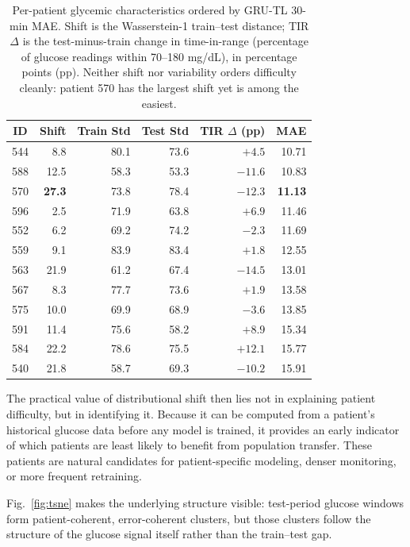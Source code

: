 \documentclass[conference]{IEEEtran}
\begin{document}
\begin{table}[t]
\centering
\caption{Per-patient glycemic characteristics ordered by GRU-TL 30-min MAE. Shift
is the Wasserstein-1 train--test distance; TIR $\Delta$ is the test-minus-train
change in time-in-range (percentage of glucose readings within 70--180 mg/dL), in
percentage points (pp). Neither shift nor variability orders difficulty cleanly:
patient 570 has the largest shift yet is among the easiest.}
\label{tab:patient}
\footnotesize
\setlength{\tabcolsep}{4.5pt}
\begin{tabular}{@{}c r rr r r@{}}
\toprule
ID & Shift & Train Std & Test Std & TIR $\Delta$ (pp) & MAE \\
\midrule
544 &  8.8 & 80.1 & 73.6 & $+4.5$  & 10.71 \\
588 & 12.5 & 58.3 & 53.3 & $-11.6$ & 10.83 \\
570 & \textbf{27.3} & 73.8 & 78.4 & $-12.3$ & \textbf{11.13} \\
596 &  2.5 & 71.9 & 63.8 & $+6.9$  & 11.46 \\
552 &  6.2 & 69.2 & 74.2 & $-2.3$  & 11.69 \\
559 &  9.1 & 83.9 & 83.4 & $+1.8$  & 12.55 \\
563 & 21.9 & 61.2 & 67.4 & $-14.5$ & 13.01 \\
567 &  8.3 & 77.7 & 73.6 & $+1.9$  & 13.58 \\
575 & 10.0 & 69.9 & 68.9 & $-3.6$  & 13.85 \\
591 & 11.4 & 75.6 & 58.2 & $+8.9$  & 15.34 \\
584 & 22.2 & 78.6 & 75.5 & $+12.1$ & 15.77 \\
540 & 21.8 & 58.7 & 69.3 & $-10.2$ & 15.91 \\
\bottomrule
\end{tabular}
\end{table}

The practical value of distributional shift then lies not in explaining patient difficulty, but in identifying it. Because it can be computed from a patient's historical glucose data before any model is trained, it provides an early indicator of which patients are least likely to benefit from population transfer. These patients are natural candidates for patient-specific modeling, denser monitoring, or more frequent retraining.

Fig.~\ref{fig:tsne} makes the underlying structure visible: test-period glucose
windows form patient-coherent, error-coherent clusters, but those clusters follow
the structure of the glucose signal itself rather than the train--test gap.
\end{document}
